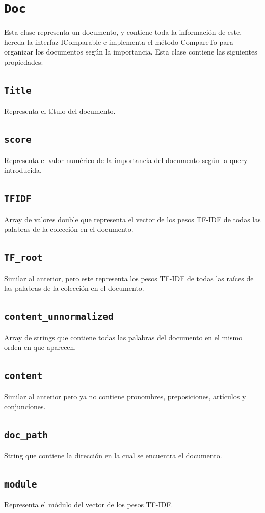 \documentclass{report}
\newcommand{\csharpproperty}[1]{\textcolor{csharp-property}{\texttt{#1}}}
\begin{document}
\section{\LARGE\csharpproperty{Doc}}
Esta clase representa un documento, y contiene toda la información de este, hereda la interfaz
IComparable e implementa el método CompareTo para organizar los documentos según la importancia.
Esta clase contiene las siguientes propiedades:
\subsection{\csharpproperty{Title}}
Representa el título del documento.
\subsection{\csharpproperty{score}}
Representa el valor numérico de la importancia del documento según la query introducida.
\subsection{\csharpproperty{TFIDF}}
Array de valores double que representa el vector de los pesos TF-IDF de todas las palabras de la colección en el documento.
\subsection{\csharpproperty{TF\_{}root}}
Similar al anterior, pero este representa los pesos TF-IDF de todas las raíces de las palabras de la colección en el documento.
\subsection{\csharpproperty{content\_{}unnormalized}}
Array de strings que contiene todas las palabras del documento en el mismo orden en que aparecen.
\subsection{\csharpproperty{content}}
Similar al anterior pero ya no contiene pronombres, preposiciones, artículos y conjunciones.
\subsection{\csharpproperty{doc\_{}path}}
String que contiene la dirección en la cual se encuentra el documento.
\subsection{\csharpproperty{module}}
Representa el módulo del vector de los pesos TF-IDF.
\end{document}

